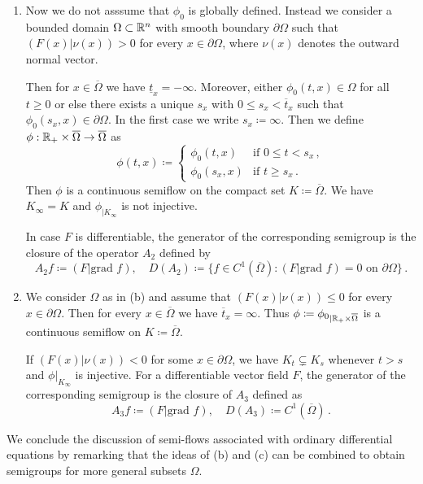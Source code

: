\begin{example}
\begin{enumerate}[\upshape (a), wide, labelindent=.5em]
	\item 
	Now we do not asssume that  $\phi_0$ is globally defined.
	Instead we consider a bounded domain $\Omega \subset \mathbb{R}^n$ with smooth boundary $\partial\Omega$ such that $(F(x)|\nu(x)) > 0$ for every $x \in \partial\Omega$, where $\nu(x)$ denotes the outward normal vector.
	
	Then for $x \in \overline{\Omega}$ we have $\underline{t}_{x} = -\infty$.
	Moreover, either $\phi_{0}(t,x) \in \Omega$ for all $t \geq 0$ or else there exists a unique $s_{x}$ with $0 \leq s_{x} < \overline{t}_{x}$ such that $\phi_{0}(s_{x},x) \in \partial\Omega$.
	In the first case we write $s_{x} \coloneq \infty$.
	Then we define $\phi: \mathbb{R}_{+} \times \overline{\Omega} \to \overline{\Omega}$ as 
	\[\phi(t,x) \coloneq \begin{cases}
		\phi_{0}(t,x) & \text{if } 0 \leq t < s_{x} \,, \\
		\phi_{0}(s_{x},x) & \text{if } t \geq s_{x} \,.
	\end{cases}\]
	Then $\phi$ is a continuous semiflow on the compact set $K \coloneq \overline{\Omega}$.
	We have $K_{\infty} = K$ and $\phi_{|K_{\infty}}$ is not injective.
	
	In case $F$ is differentiable, the generator of the corresponding semigroup is the closure of the operator $A_{2}$ defined by
	\[
	A_{2}f \coloneq (F|\text{grad }f), \quad D(A_{2}) \coloneq \{f \in C^1(\overline{\Omega}) : (F|\text{grad }f) = 0 \text{ on } \partial\Omega\}\,.	
	\]
	
	\item 
	We consider $\Omega$ as in (b) and assume that $(F(x)|\nu(x)) \leq 0$ for every $x \in \partial\Omega$.
	Then for every $x \in \overline{\Omega}$ we have $\overline{t}_{x} = \infty$.
	Thus $\phi \coloneq {\phi_{0}}_{|\mathbb{R}_{+}\times\overline{\Omega}}$ is a continuous semiflow on $K \coloneq \overline{\Omega}$.
	
	If $(F(x)|\nu(x)) < 0$ for some $x \in \partial\Omega$, we have $K_{t} \subsetneq K_{s}$ whenever $t > s$ and $\phi|_{K_{\infty}}$ is injective.
	For a differentiable vector field $F$, the generator of the corresponding semigroup is the closure of $A_{3}$ defined as
	\[
	A_{3}f \coloneq (F|\text{grad }f), \quad D(A_{3}) \coloneq C^1(\overline{\Omega})\,.
	\]
\end{enumerate}
\end{example}

We conclude the discussion of semi-flows associated with ordinary differential equations by remarking that the ideas of (b) and (c) can be combined to obtain semigroups for more general subsets $\Omega$.

